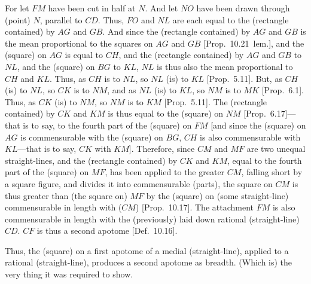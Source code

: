 \begin{Parallel}{}{}
{For let $FM$ have been cut in half at $N$. And let $NO$ have been drawn
through (point) $N$, parallel to $CD$. Thus, $FO$ and
$NL$ are each equal to the (rectangle contained) by $AG$ and $GB$.
And since
the (rectangle contained) by $AG$ and $GB$ is the mean
proportional to the squares on $AG$ and $GB$ [Prop.~10.21~lem.], and the (square) on $AG$
is equal to $CH$, and the (rectangle contained) by $AG$ and
$GB$ to $NL$, and the (square) on $BG$ to $KL$,  $NL$ is thus also the
mean proportional to $CH$ and $KL$. Thus, as $CH$ is to $NL$, so
$NL$ (is) to $KL$ [Prop.~5.11]. But, as $CH$ (is) to $NL$, so $CK$ is to
$NM$, and as $NL$ (is) to $KL$, so $NM$ is to $MK$
[Prop.~6.1]. Thus, as $CK$ (is) to $NM$, so $NM$
is to $KM$ [Prop.~5.11]. The (rectangle contained) by  $CK$ and $KM$ is thus
equal to the (square) on $NM$ [Prop.~6.17]---that is to say, to the fourth part of the
(square) on $FM$ [and since the (square) on $AG$ is commensurable
with the (square) on $BG$, $CH$ is also commensurable with $KL$---that is to say, $CK$ with $KM$].  Therefore, since $CM$ and $MF$ are two
unequal straight-lines, and the (rectangle contained) by $CK$ and
$KM$, equal to the fourth part
of the (square) on $MF$,  has been applied to the greater $CM$,
falling short by a square figure, and divides it into commensurable
(parts), the square on $CM$ is thus greater than (the square on)
$MF$ by the (square) on (some straight-line) commensurable
in length with ($CM$) [Prop.~10.17]. The
attachment $FM$ is also commensurable in length with the (previously)
laid down rational (straight-line) $CD$. $CF$ is thus a second apotome [Def.~10.16].

Thus, the (square) on a first apotome of
a medial (straight-line), applied to a rational (straight-line), produces
 a second apotome as breadth. (Which is) the very thing it was required to
show.}
\end{Parallel}

